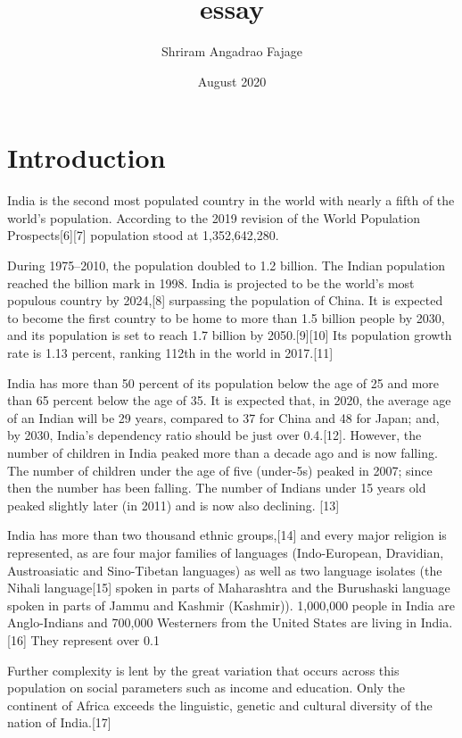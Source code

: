 \documentclass[12pt]{article}
\title{essay}
\author{Shriram Angadrao Fajage}
\date{August 2020}
\begin{document}
\maketitle

\section{Introduction}
India is the second most populated country in the world with nearly a fifth of the world's population. According to the 2019 revision of the World Population Prospects[6][7] population stood at 1,352,642,280.

During 1975–2010, the population doubled to 1.2 billion. The Indian population reached the billion mark in 1998. India is projected to be the world's most populous country by 2024,[8] surpassing the population of China. It is expected to become the first country to be home to more than 1.5 billion people by 2030, and its population is set to reach 1.7 billion by 2050.[9][10] Its population growth rate is 1.13 percent, ranking 112th in the world in 2017.[11]

India has more than 50 percent of its population below the age of 25 and more than 65 percent below the age of 35. It is expected that, in 2020, the average age of an Indian will be 29 years, compared to 37 for China and 48 for Japan; and, by 2030, India's dependency ratio should be just over 0.4.[12]. However, the number of children in India peaked more than a decade ago and is now falling. The number of children under the age of five (under-5s) peaked in 2007; since then the number has been falling. The number of Indians under 15 years old peaked slightly later (in 2011) and is now also declining. [13]

India has more than two thousand ethnic groups,[14] and every major religion is represented, as are four major families of languages (Indo-European, Dravidian, Austroasiatic and Sino-Tibetan languages) as well as two language isolates (the Nihali language[15] spoken in parts of Maharashtra and the Burushaski language spoken in parts of Jammu and Kashmir (Kashmir)). 1,000,000 people in India are Anglo-Indians and 700,000 Westerners from the United States are living in India.[16] They represent over 0.1%

Further complexity is lent by the great variation that occurs across this population on social parameters such as income and education. Only the continent of Africa exceeds the linguistic, genetic and cultural diversity of the nation of India.[17]
\end{document}
